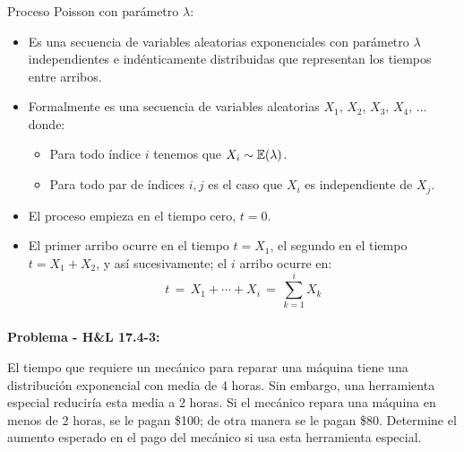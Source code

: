 \documentclass[ 10pt, xcolor = dvipsnames]{beamer}
\begin{document}
\begin{frame}[allowframebreaks]
\frametitle{\insertsection}

Proceso Poisson con par\'ametro $\lambda$: 
\begin{itemize}
\item Es una secuencia de variables aleatorias exponenciales con par\'ametro $\lambda$ independientes e ind\'enticamente distribuidas que representan los tiempos entre arribos. 
\item Formalmente es una secuencia de variables aleatorias $X_1, \, X_2, \, X_3, \, X_4, \, \dots$ donde: 
\begin{itemize}
\item Para todo \'indice $i$ tenemos que $X_i \sim \mathbb{E}(\lambda)$. 
\item Para todo par de \'indices $i,j$ es el caso que $X_i$ es independiente de $X_j$. 
\end{itemize}
\item El proceso empieza en el tiempo cero, \ie $t = 0$. 
\item El primer arribo ocurre en el tiempo $t = X_1$, el segundo en el tiempo $t = X_1 + X_2$, y as\'i sucesivamente; \ie el $i$ arribo ocurre en: 
\[
t \, = \, X_1 + \cdots + X_i \, = \, \sum_{k=1}^i X_k
\]
\end{itemize}

\end{frame}

\begin{frame}[allowframebreaks]
\frametitle{\insertsection}

\textbf{Problema - H\&L 17.4-3:}

El tiempo que requiere un mec\'anico para reparar una m\'aquina tiene una distribuci\'on exponencial con media de 4 horas. Sin embargo, una herramienta especial reducir\'ia esta media a 2 horas. Si el mec\'anico repara una m\'aquina en menos de 2 horas, se le pagan
\$100; de otra manera se le pagan \$80. Determine el aumento esperado en el pago del mec\'anico si usa esta herramienta especial. 

\end{frame}
\end{document}
